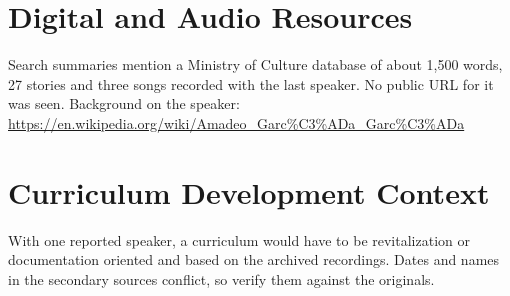 \documentclass[12pt]{article}
\begin{document}
\section{Digital and Audio Resources}
Search summaries mention a Ministry of Culture database of about 1,500 words, 27 stories and three songs recorded with the last speaker. No public URL for it was seen. Background on the speaker: \url{https://en.wikipedia.org/wiki/Amadeo_Garc%C3%ADa_Garc%C3%ADa}

\section{Curriculum Development Context}
With one reported speaker, a curriculum would have to be revitalization or documentation oriented and based on the archived recordings. Dates and names in the secondary sources conflict, so verify them against the originals.
\end{document}
